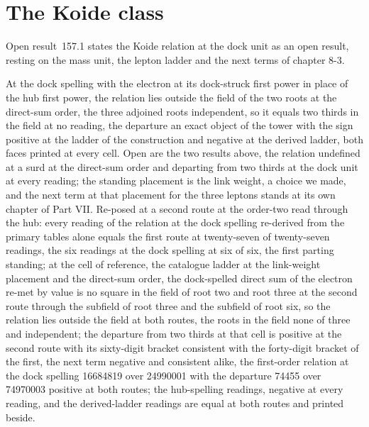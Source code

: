 \par\medskip{}\label{narr:close:5-11}\par
\section{The Koide class}\label{mod:V-12-koide-class}
\label{narr:open:5-12}Open result~157.1 states the Koide relation at the dock unit as an open result, resting on the mass unit, the lepton ladder and the next terms of chapter 8-3.
\begin{chwall}\label{box:V-12-koide-class:1}
At the dock spelling with the electron at its dock-struck first power in place of the hub first power, the relation lies outside the field of the two roots at the direct-sum order, the three adjoined roots independent, so it equals two thirds in the field at no reading, the departure an exact object of the tower with the sign positive at the ladder of the construction and negative at the derived ladder, both faces printed at every cell.
Open are the two results above, the relation undefined at a surd at the direct-sum order and departing from two thirds at the dock unit at every reading; the standing placement is the link weight, a choice we made, and the next term at that placement for the three leptons stands at its own chapter of Part VII. Re-posed at a second route at the order-two read through the hub: every reading of the relation at the dock spelling re-derived from the primary tables alone equals the first route at twenty-seven of twenty-seven readings, the six readings at the dock spelling at six of six, the first parting standing; at the cell of reference, the catalogue ladder at the link-weight placement and the direct-sum order, the dock-spelled direct sum of the electron re-met by value is no square in the field of root two and root three at the second route through the subfield of root three and the subfield of root six, so the relation lies outside the field at both routes, the roots in the field none of three and independent; the departure from two thirds at that cell is positive at the second route with its sixty-digit bracket consistent with the forty-digit bracket of the first, the next term negative and consistent alike, the first-order relation at the dock spelling 16684819 over 24990001 with the departure 74455 over 74970003 positive at both routes; the hub-spelling readings, negative at every reading, and the derived-ladder readings are equal at both routes and printed beside.
\end{chwall}
